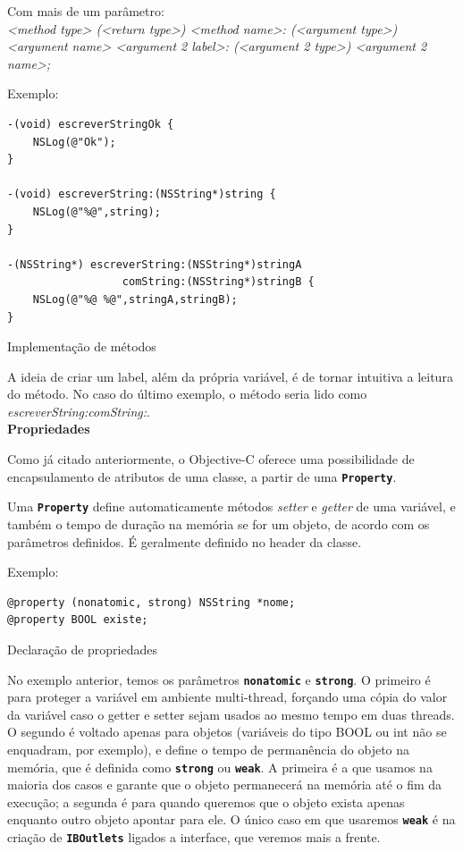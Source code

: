 \documentclass[a4paper,12pt,brazil,doubleside]{book}
\begin{document}
\begin{singlespace}
Com mais de um parâmetro:\\
\emph{<method type> (<return type>) <method name>: (<argument type>) <argument name> <argument 2 label>: (<argument 2 type>) <argument 2 name>;}


Exemplo:

\begin{listing}
\begin{verbatim}
-(void) escreverStringOk {
	NSLog(@"Ok");
}

-(void) escreverString:(NSString*)string {
	NSLog(@"%@",string);
}

-(NSString*) escreverString:(NSString*)stringA
                  comString:(NSString*)stringB {
	NSLog(@"%@ %@",stringA,stringB);
}
\end{verbatim}
\caption{Implementação de métodos}
\end{listing}


A ideia de criar um label, além da própria variável, é de tornar intuitiva a leitura do método. No caso do último exemplo, o método seria lido como \emph{escreverString:comString:}.\\


\textbf{Propriedades}


Como já citado anteriormente, o Objective-C oferece uma possibilidade de encapsulamento de atributos de uma classe, a partir de uma \texttt{\textbf{Property}}.

Uma \texttt{\textbf{Property}} define automaticamente métodos \emph{setter} e \emph{getter} de uma variável, e também o tempo de duração na memória se for um objeto, de acordo com os parâmetros definidos. É geralmente definido no header da classe.

Exemplo:

\begin{listing}[H]
\begin{verbatim}
@property (nonatomic, strong) NSString *nome;
@property BOOL existe;
\end{verbatim}
\caption{Declaração de propriedades}
\end{listing}


No exemplo anterior, temos os parâmetros \texttt{\textbf{nonatomic}} e \texttt{\textbf{strong}}. O primeiro é para proteger a variável em ambiente multi-thread, forçando uma cópia do valor da variável caso o getter e setter sejam usados ao mesmo tempo em duas threads. O segundo é voltado apenas para objetos (variáveis do tipo BOOL ou int não se enquadram, por exemplo), e define o tempo de permanência do objeto na memória, que é definida como \texttt{\textbf{strong}} ou \texttt{\textbf{weak}}. A primeira é a que usamos na maioria dos casos e garante que o objeto permanecerá na memória até o fim da execução; a segunda é para quando queremos que o objeto exista apenas enquanto outro objeto apontar para ele. O único caso em que usaremos \texttt{\textbf{weak}} é na criação de \texttt{\textbf{IBOutlets}} ligados a interface, que veremos mais a frente.



\end{singlespace}
\end{document}
